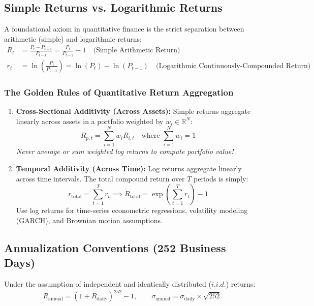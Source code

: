 \documentclass[11pt,a4paper]{article}
\begin{document}
\subsection{Simple Returns vs. Logarithmic Returns}
A foundational axiom in quantitative finance is the strict separation between arithmetic (simple) and logarithmic returns:
\begin{align}
R_t &= \frac{P_t - P_{t-1}}{P_{t-1}} = \frac{P_t}{P_{t-1}} - 1 \quad \text{(Simple Arithmetic Return)} \\
r_t &= \ln\left(\frac{P_t}{P_{t-1}}\right) = \ln(P_t) - \ln(P_{t-1}) \quad \text{(Logarithmic Continuously-Compounded Return)}
\end{align}

\subsubsection*{The Golden Rules of Quantitative Return Aggregation}
\begin{enumerate}
    \item \textbf{Cross-Sectional Additivity (Across Assets):} Simple returns aggregate linearly across assets in a portfolio weighted by $w_i \in \mathbb{R}^N$:
    \begin{equation}
    R_{p,t} = \sum_{i=1}^N w_i R_{i,t} \quad \text{where } \sum_{i=1}^N w_i = 1
    \end{equation}
    \textit{Never average or sum weighted log returns to compute portfolio value!}
    \item \textbf{Temporal Additivity (Across Time):} Log returns aggregate linearly across time intervals. The total compound return over $T$ periods is simply:
    \begin{equation}
    r_{\text{total}} = \sum_{t=1}^T r_t \implies R_{\text{total}} = \exp\left(\sum_{t=1}^T r_t\right) - 1
    \end{equation}
    Use log returns for time-series econometric regressions, volatility modeling (GARCH), and Brownian motion assumptions.
\end{enumerate}

\subsection{Annualization Conventions (252 Business Days)}
Under the assumption of independent and identically distributed ($i.i.d.$) returns:
\begin{equation}
\bar{R}_{\text{annual}} = (1 + \bar{R}_{\text{daily}})^{252} - 1, \qquad \sigma_{\text{annual}} = \sigma_{\text{daily}} \times \sqrt{252}
\end{equation}
\end{document}
